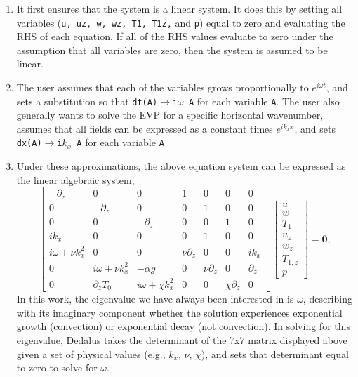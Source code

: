 \begin{enumerate}
\item It first ensures that the system is a linear system.
It does this by setting all variables (\texttt{u, uz, w, wz, T1, T1z,} and \texttt{p}) equal to zero and evaluating the RHS of each equation.
If all of the RHS values evaluate to zero under the assumption that all variables are zero, then the system is assumed to be linear.
\item The user assumes that each of the variables grows proportionally to $e^{i\omega t}$, and sets a substitution so that \texttt{dt(A)}$\rightarrow$\texttt{i$\omega$ A} for each variable \texttt{A}.
The user also generally wants to solve the EVP for a specific horizontal wavenumber, assumes that all fields can be expressed as a constant times $e^{i k_x x}$, and sets \texttt{dx(A)}$\rightarrow$\texttt{i$k_x$ A} for each variable \texttt{A}
\item Under these approximations, the above equation system can be expressed as the linear algebraic system,
\begin{equation}
\begin{bmatrix}
-\partial_z 		& 0 					& 0 					& 1 			& 0 			& 0 				& 0 \\
0    				& -\partial_z 			& 0 					& 0 			& 1 			& 0 				& 0 \\
0    				& 0 					& -\partial_z 			& 0 			& 0 			& 1 				& 0 \\
ik_x 				& 0 					& 0 					& 0 			& 1 			& 0 				& 0 \\
i\omega + \nu k_x^2 & 0						& 0						& \nu\partial_z & 0				& 0 				& i k_x \\
0					& i\omega + \nu k_x^2	& -\alpha g				& 0				& \nu\partial_z & 0 				& \partial_z \\
0					& \partial_z T_0		& i\omega + \chi k_x^2	& 0				& 0				& \chi\partial_z	& 0
\end{bmatrix}
\begin{bmatrix}
u \\ w \\ T_1 \\ u_z \\ w_z \\ T_{1,z} \\ p
\end{bmatrix}
= \bm{0},
\end{equation}
In this work, the eigenvalue we have always been interested in is $\omega$, describing with its imaginary component whether the solution experiences exponential growth (convection) or exponential decay (not convection).
In solving for this eigenvalue, Dedalus takes the determinant of the 7x7 matrix displayed above given a set of physical values (e.g., $k_x$, $\nu$, $\chi$), and sets that determinant equal to zero to solve for $\omega$.
\end{enumerate}

